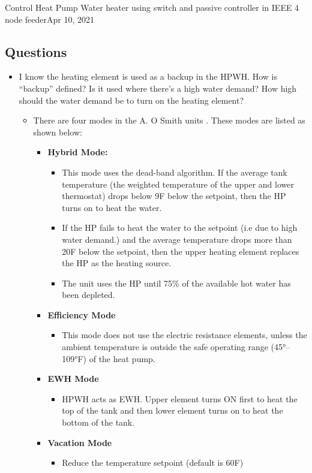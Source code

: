 \begin{entry}{Control Heat Pump Water heater using switch and passive controller in IEEE 4 node feeder}{Apr 10, 2021}
\subsection{Questions}
\begin{itemize}
    \item I know the heating element is used as a backup in the HPWH. How is “backup” defined? Is it used where there’s a high water demand? How high should the water demand be to turn on the heating element?
    \begin{itemize}
        \item There are four modes in the A. O Smith units \cite{r1}. These modes are listed as shown below:
        \begin{itemize}
            \item \textbf{Hybrid Mode:}
            \begin{itemize}
                \item This mode uses the dead-band algorithm. If the average tank temperature (the weighted temperature of the upper and lower thermostat) drops below 9F below the setpoint, then the HP turns on to heat the water.
                \item If the HP fails to heat the water to the setpoint (i.e due to high water demand.) and the average temperature drops more than 20F below the setpoint, then the upper heating element replaces the HP as the heating source. 
                \item The unit uses the HP until 75$\%$ of the available hot water has been depleted. 
            \end{itemize}
            \item \textbf{Efficiency Mode}
            \begin{itemize}
                \item This mode does not use the electric resistance elements, unless the ambient temperature is outside the safe operating range (45°–109°F) of the heat pump.
            \end{itemize}
            \item \textbf{EWH Mode}
            \begin{itemize}
                \item HPWH acts as EWH. Upper element turns ON first to heat the top of the tank and then lower element turns on to heat the bottom of the tank.
            \end{itemize}
            \item \textbf{Vacation Mode}
            \begin{itemize}
                \item Reduce the temperature setpoint (default is 60F)
            \end{itemize}
        \end{itemize}
    \end{itemize}
\end{itemize}

\end{entry}

